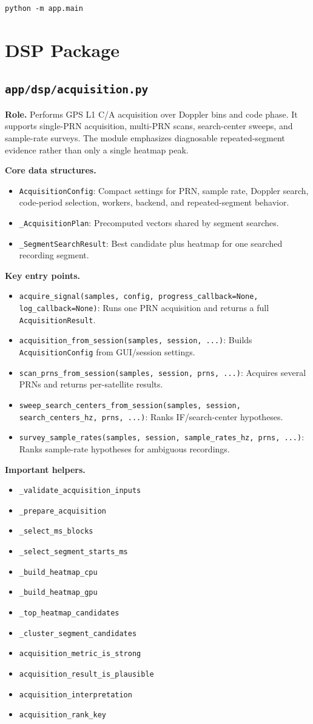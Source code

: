 \documentclass[11pt,a4paper]{article}
\newcommand{\codepath}[1]{\nolinkurl{#1}}
\newcommand{\codeheading}[1]{\texorpdfstring{\codepath{#1}}{#1}}
\newcommand{\codesym}[1]{\nolinkurl{#1}}
\newcommand{\apiitem}[2]{\item \codesym{#1}: #2}
\newcommand{\apisym}[1]{\item \codesym{#1}}
\begin{document}
\begin{lstlisting}[style=pythonapi]
python -m app.main
\end{lstlisting}

\section{DSP Package}

\subsection{\codeheading{app/dsp/acquisition.py}}

\textbf{Role.} Performs GPS L1 C/A acquisition over Doppler bins and code phase. It supports single-PRN acquisition, multi-PRN scans, search-center sweeps, and sample-rate surveys. The module emphasizes diagnosable repeated-segment evidence rather than only a single heatmap peak.

\textbf{Core data structures.}
\begin{itemize}
  \apiitem{AcquisitionConfig}{Compact settings for PRN, sample rate, Doppler search, code-period selection, workers, backend, and repeated-segment behavior.}
  \apiitem{\_AcquisitionPlan}{Precomputed vectors shared by segment searches.}
  \apiitem{\_SegmentSearchResult}{Best candidate plus heatmap for one searched recording segment.}
\end{itemize}

\textbf{Key entry points.}
\begin{itemize}
  \apiitem{acquire_signal(samples, config, progress_callback=None, log_callback=None)}{Runs one PRN acquisition and returns a full \texttt{AcquisitionResult}.}
  \apiitem{acquisition_from_session(samples, session, ...)}{Builds \texttt{AcquisitionConfig} from GUI/session settings.}
  \apiitem{scan_prns_from_session(samples, session, prns, ...)}{Acquires several PRNs and returns per-satellite results.}
  \apiitem{sweep_search_centers_from_session(samples, session, search_centers_hz, prns, ...)}{Ranks IF/search-center hypotheses.}
  \apiitem{survey_sample_rates(samples, session, sample_rates_hz, prns, ...)}{Ranks sample-rate hypotheses for ambiguous recordings.}
\end{itemize}

\textbf{Important helpers.}
\begin{itemize}
  \apisym{\_validate_acquisition_inputs}
  \apisym{\_prepare_acquisition}
  \apisym{\_select_ms_blocks}
  \apisym{\_select_segment_starts_ms}
  \apisym{\_build_heatmap_cpu}
  \apisym{\_build_heatmap_gpu}
  \apisym{\_top_heatmap_candidates}
  \apisym{\_cluster_segment_candidates}
  \apisym{acquisition_metric_is_strong}
  \apisym{acquisition_result_is_plausible}
  \apisym{acquisition_interpretation}
  \apisym{acquisition_rank_key}
\end{itemize}
\end{document}
